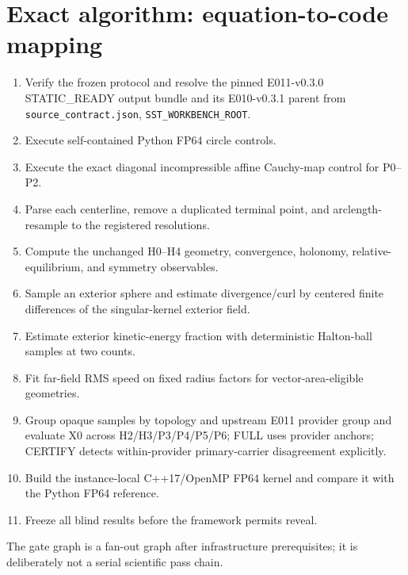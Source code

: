 \documentclass[11pt,a4paper]{article}
\begin{document}

\section{Exact algorithm: equation-to-code mapping}
\begin{enumerate}[label=S\arabic*.]
\item Verify the frozen protocol and resolve the pinned E011-v0.3.0 STATIC\_READY output bundle and its E010-v0.3.1 parent from \texttt{source\_contract.json}, \texttt{SST\_WORKBENCH\_ROOT}.
\item Execute self-contained Python FP64 circle controls.
\item Execute the exact diagonal incompressible affine Cauchy-map control for P0--P2.
\item Parse each centerline, remove a duplicated terminal point, and arclength-resample to the registered resolutions.
\item Compute the unchanged H0--H4 geometry, convergence, holonomy, relative-equilibrium, and symmetry observables.
\item Sample an exterior sphere and estimate divergence/curl by centered finite differences of the singular-kernel exterior field.
\item Estimate exterior kinetic-energy fraction with deterministic Halton-ball samples at two counts.
\item Fit far-field RMS speed on fixed radius factors for vector-area-eligible geometries.
\item Group opaque samples by topology and upstream E011 provider group and evaluate X0 across H2/H3/P3/P4/P5/P6; FULL uses provider anchors; CERTIFY detects within-provider primary-carrier disagreement explicitly.
\item Build the instance-local C++17/OpenMP FP64 kernel and compare it with the Python FP64 reference.
\item Freeze all blind results before the framework permits reveal.
\end{enumerate}
The gate graph is a fan-out graph after infrastructure prerequisites; it is deliberately not a serial scientific pass chain.

\end{document}
